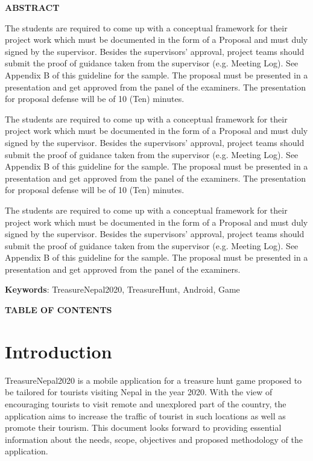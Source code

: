 \documentclass[12pt, a4paper, oneside]{article}
\begin{document}
\large
\begin{center}
	\textbf{ABSTRACT}
\end{center}

\normalsize
The students are required to come up with a conceptual framework for their project work which must be documented in the form of a Proposal and must duly signed by the supervisor. Besides the supervisors’ approval, project teams should submit the proof of guidance taken from the supervisor (e.g. Meeting Log). See Appendix B of this guideline for the sample. The proposal must be presented in a presentation and get approved from the panel of the examiners. The presentation for proposal defense will be of 10 (Ten) minutes. 

The students are required to come up with a conceptual framework for their project work which must be documented in the form of a Proposal and must duly signed by the supervisor. Besides the supervisors’ approval, project teams should submit the proof of guidance taken from the supervisor (e.g. Meeting Log). See Appendix B of this guideline for the sample. The proposal must be presented in a presentation and get approved from the panel of the examiners. The presentation for proposal defense will be of 10 (Ten) minutes. 

The students are required to come up with a conceptual framework for their project work which must be documented in the form of a Proposal and must duly signed by the supervisor. Besides the supervisors’ approval, project teams should submit the proof of guidance taken from the supervisor (e.g. Meeting Log). See Appendix B of this guideline for the sample. The proposal must be presented in a presentation and get approved from the panel of the examiners.

\textbf{Keywords}: TreasureNepal2020, TreasureHunt, Android, Game\\

\break

\large
\begin{center}
	\textbf{TABLE OF CONTENTS}
\end{center}


\normalsize
\setlength{\cftbeforetoctitleskip}{0pt}
\renewcommand{\contentsname}{}
\tableofcontents

\break

\cfoot{\textbf{\thepage} /  \pageref{LastPage}}

\section{Introduction} 
TreasureNepal2020 is a mobile application for a treasure hunt game proposed to be tailored for tourists visiting Nepal in the year 2020. With the view of encouraging tourists to visit remote and unexplored part of the country, the application aims to increase the traffic of tourist in such locations as well as promote their tourism. This document looks forward to providing essential information about the needs, scope, objectives and proposed methodology of the application.
\end{document}
